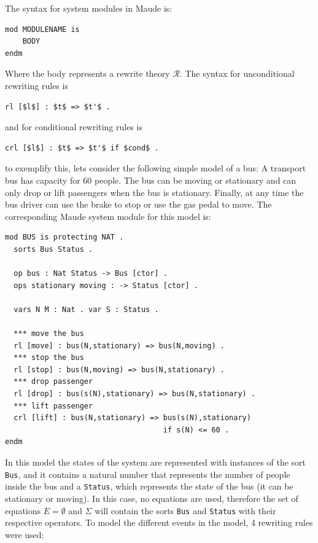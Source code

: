 The syntax for system modules in Maude is:
\begin{lstlisting}
mod MODULENAME is
    BODY
endm
\end{lstlisting}
Where the body represents a rewrite theory $\mathscr{R}$. The syntax for unconditional rewriting rules is
\begin{lstlisting}[mathescape=true]
rl [$l$] : $t$ => $t'$ .
\end{lstlisting}
and for conditional rewriting rules is
\begin{lstlisting}[mathescape=true]
crl [$l$] : $t$ => $t'$ if $cond$ .
\end{lstlisting}
to exemplify this, lets consider the following simple model of a bus: A transport bus has capacity for 60 people. The bus can be moving or stationary and can only drop or lift passengers when the bus is stationary. Finally, at any time the bus driver can use the brake to stop or use the gas pedal to move. The corresponding Maude system module for this model is:
\begin{lstlisting}
mod BUS is protecting NAT .
  sorts Bus Status .

  op bus : Nat Status -> Bus [ctor] .
  ops stationary moving : -> Status [ctor] .
 
  vars N M : Nat . var S : Status .

  *** move the bus
  rl [move] : bus(N,stationary) => bus(N,moving) .
  *** stop the bus 
  rl [stop] : bus(N,moving) => bus(N,stationary) .
  *** drop passenger
  rl [drop] : bus(s(N),stationary) => bus(N,stationary) .
  *** lift passenger
  crl [lift] : bus(N,stationary) => bus(s(N),stationary) 
                                    if s(N) <= 60 . 
endm
\end{lstlisting}
In this model the states of the system are represented with instances of the sort \texttt{Bus}, and it contains a natural number that represents the number of people inside the bus and a \texttt{Status}, which represents the state of the bus (it can be stationary or moving). In this case, no equations are used, therefore the set of equations $E = \emptyset$  and $\Sigma$ will contain the sorts \texttt{Bus} and \texttt{Status} with their respective operators. To model the different events in the model, 4 rewriting rules were used:
